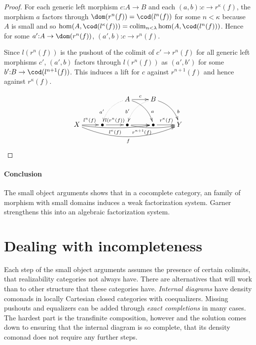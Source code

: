 \documentclass{tac}
\newcommand\of{\mathord:}
\newcommand\colim{\mathop{\mathrm{colim}}}
\begin{document}
\begin{proof}
For each generic left morphism $c\of A \to B$ and each $(a,b)\of c\to r^\kappa(f)$, the morphism $a$ factors through $\dom(r^n(f)) = \cod(l^n(f))$ for some $n<\kappa$ because $A$ is small and so $\hom(A,\cod(l^\kappa(f))) =\colim_{n<\lambda} \hom(A,\cod(l^n(f)))$.
Hence for some $a'\of A\to \dom(r^n(f))$, $(a',b)\of c\to r^n(f)$.

Since $l(r^n(f))$ is the pushout of the colimit of $c'\to r^n(f)$ for all generic left morphisms $c'$, $(a',b)$ factors through $l(r^n(f))$ as $(a',b')$ for some $b'\of B \to \cod(l^{n+1}(f))$. This induces a lift for $c$ against $r^{n+1}(f)$ and hence against $r^\kappa(f)$.

\[\xymatrix{
&& A\ar[r]^{c}\ar@/^2ex/[dr]^(.7)a\ar@{.>}@/_2ex/[dl]_(.7){a'} & B\ar@/^2ex/[dr]^(.7)b\ar@{.>}@/_2ex/[dl]_(.7){b'} \\
X \ar[r]^{l^n(f)} \ar@/_1ex/[rrr]_{l^{\kappa}(f)} \ar@/_4ex/[rrrr]_{f} & \bullet \ar[r]^{l(r^n(f))}  & \bullet \ar[r]\ar@/_1ex/[rr]_(.3){r^{n+1}(f)} & \bullet \ar[r]^{r^\kappa(f)} & Y
}\]
\end{proof}

\paragraph{Conclusion}
The small object arguments shows that in a cocomplete category, an family of morphism with small domains induces a weak factorization system. Garner %
strengthens this into an algebraic factorization system.

\section{Dealing with incompleteness}
Each step of the small object arguments assumes the presence of certain colimits, that realizability categories not always have. There are alternatives that will work than to other structure that these categories have.
 \emph{Internal diagrams} have density comonads in locally Cartesian closed categories with coequalizers. Missing pushouts and equalizers can be added through \emph{exact completions} in many cases.
The hardest part is the transfinite composition, however and the solution comes down to ensuring that the internal diagram is so complete, that its density comonad does not require any further steps.
\end{document}

